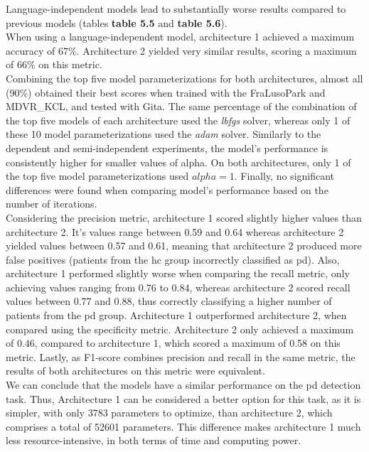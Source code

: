 Language-independent models lead to substantially worse results compared to previous models (tables \textbf{table 5.5} and \textbf{table 5.6}). \\
When using a language-independent model, architecture 1 achieved a maximum accuracy of 67\%. Architecture 2 yielded very similar results, scoring a maximum of 66\% on this metric. \\
Combining the top five model parameterizations for both architectures, almost all (90\%) obtained their best scores when trained with the FraLusoPark and MDVR\_KCL, and tested with Gita. The same percentage of the combination of the top five models of each architecture used the \textit{lbfgs} solver, whereas only 1 of these 10 model parameterizations used the \textit{adam} solver. Similarly to the dependent and semi-independent experiments, the model's performance is consistently higher for smaller values of alpha. On both architectures, only 1 of the top five model parameterizations used $alpha = 1$. Finally, no significant differences were found when comparing model's performance based on the number of iterations. \\
Considering the precision metric, architecture 1 scored slightly higher values than architecture 2. It's values range between 0.59 and 0.64 whereas architecture 2 yielded values between 0.57 and 0.61, meaning that architecture 2 produced more false positives (patients from the \gls{hc} group incorrectly classified as \gls{pd}). Also, architecture 1 performed slightly worse when comparing the recall metric, only achieving values ranging from 0.76 to 0.84, whereas architecture 2 scored recall values between 0.77 and 0.88, thus correctly classifying a higher number of patients from the \gls{pd} group. Architecture 1 outperformed architecture 2, when compared using the specificity metric. Architecture 2 only achieved a maximum of 0.46, compared to architecture 1, which scored a maximum of 0.58 on this metric. Lastly, as F1-score combines precision and recall in the same metric, the results of both architectures on this metric were equivalent. \\
We can conclude that the models have a similar performance on the \gls{pd} detection task. Thus, Architecture 1 can be considered a better option for this task, as it is simpler, with only 3783 parameters to optimize, than architecture 2, which comprises a total of 52601 parameters. This difference makes architecture 1 much less resource-intensive, in both terms of time and computing power.

